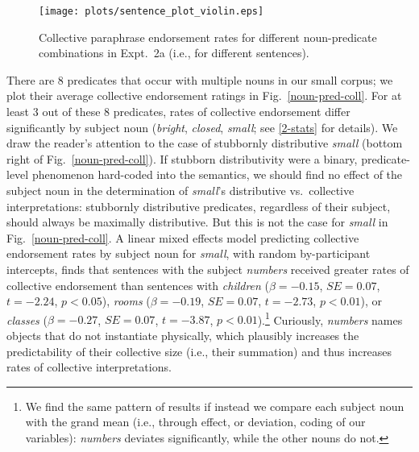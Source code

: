 \documentclass[preprint,12pt,authoryear,titlepage]{elsarticle}
\newcommand{\ndg}[1]{\textcolor{Green}{[ndg: #1]}}
\newcommand{\gcs}[1]{\textcolor{blue}{[gcs: #1]}}
\begin{document}
\begin{figure}[h!]
	\centering
	\texttt{[image: plots/sentence\_plot\_violin.eps]}
	\vspace{-20pt}
	\caption{Collective paraphrase endorsement rates for different noun-predicate combinations in Expt.~2a (i.e., for different sentences).} \label{sentence-coll}
\end{figure}

There are 8 predicates that occur with multiple nouns in our small corpus; we plot their average collective endorsement ratings in Fig.~\ref{noun-pred-coll}.
%
%
For at least 3 out of these 8 predicates, rates of collective endorsement differ significantly by subject noun (\emph{bright}, \emph{closed}, \emph{small}; see \ref{2-stats} for details). We draw the reader's attention to the case of stubbornly distributive \emph{small} (bottom right of Fig.~\ref{noun-pred-coll}). 
If stubborn distributivity were a binary, predicate-level phenomenon hard-coded into the semantics, we should find no effect of the subject noun in the determination of \emph{small}'s distributive vs.~collective interpretations: stubbornly distributive predicates, regardless of their subject, should always be maximally distributive. But this is not the case for \emph{small} in Fig.~\ref{noun-pred-coll}. 
A linear mixed effects model predicting collective endorsement rates by subject noun for \emph{small}, with random by-participant intercepts, finds that sentences with the subject \emph{numbers} received greater rates of collective endorsement than sentences with \emph{children} ($\beta=-0.15$, $SE=0.07$, $t=-2.24$, $p<0.05$), \emph{rooms} ($\beta=-0.19$, $SE=0.07$, $t=-2.73$, $p<0.01$), or \emph{classes} ($\beta=-0.27$, $SE=0.07$, $t=-3.87$, $p<0.01$).\footnote{We find the same pattern of results if instead we compare each subject noun with the grand mean (i.e., through effect, or deviation, coding of our variables): \emph{numbers} deviates significantly, while the other nouns do not.} Curiously, \emph{numbers} names objects that do not instantiate physically, which plausibly increases the predictability of their collective size (i.e., their summation) and thus increases rates of collective interpretations.
\end{document}
